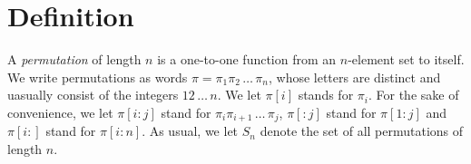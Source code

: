 \documentclass[a4paper]{llncs}
\DeclareMathOperator{\RED}{red}
\newcommand{\ptext}{\pi}
\newcommand{\pmotif}{\sigma}
\begin{document}
%
%
%


\section{Definition}
\label{section:Definitions}

A \emph{permutation} of length $n$ is a one-to-one function from an
$n$-element set to itself.
We write permutations as words
$\pi = \pi_1\pi_2\,\ldots\,\pi_n$, whose letters are distinct
and uasually consist of the integers $12\,\ldots\,n$.
We let
$\pi[i]$ stands for $\pi_i$.
For the sake of convenience, we let
$\pi[i:j]$ stand for
$\pi_i\pi_{i+1}\,\ldots\,\pi_j$,
$\pi[:j]$ stand for $\pi[1:j]$ and
$\pi[i:]$ stand for $\pi[i:n]$.
As usual, we let $S_n$ denote the set of all permutations of length $n$.

\end{document}
